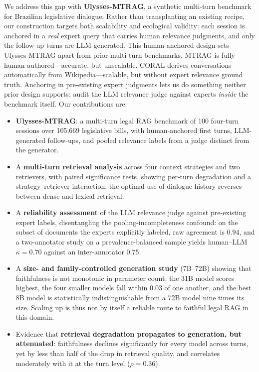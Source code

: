\documentclass[conference]{IEEEtran}
\begin{document}
We address this gap with \textbf{Ulysses-MTRAG}, a synthetic multi-turn benchmark
for Brazilian legislative dialogue. Rather than transplanting an existing recipe,
our construction targets both scalability and ecological validity: each session is
anchored in a \emph{real} expert query that carries human relevance judgments, and
only the follow-up turns are LLM-generated. This human-anchored design sets
Ulysses-MTRAG apart from prior multi-turn benchmarks. MTRAG \cite{Katsis2025MTRAG}
is fully human-authored---accurate, but unscalable. CORAL \cite{Cheng2025CORAL}
derives conversations automatically from Wikipedia---scalable, but without expert
relevance ground truth. Anchoring in pre-existing expert judgments lets us do
something neither prior design supports: audit the LLM relevance judge against
experts \emph{inside} the benchmark itself. Our contributions are:
\begin{itemize}
  \item \textbf{Ulysses-MTRAG}: a multi-turn legal RAG benchmark of 100 four-turn
  sessions over 105{,}669 legislative bills, with human-anchored first turns,
  LLM-generated follow-ups, and pooled relevance labels from a judge distinct from
  the generator.
  \item A \textbf{multi-turn retrieval analysis} across four context strategies and
  two retrievers, with paired significance tests, showing per-turn degradation and a
  strategy--retriever interaction: the optimal use of dialogue history reverses
  between dense and lexical retrieval.
  \item A \textbf{reliability assessment} of the LLM relevance judge against
  pre-existing expert labels, disentangling the pooling-incompleteness confound:
  on the subset of documents the experts explicitly labeled, raw agreement is
  $0.94$, and a two-annotator study on a prevalence-balanced sample yields
  human--LLM $\kappa{=}0.70$ against an inter-annotator $0.75$.
  \item A \textbf{size- and family-controlled generation study} (7B--72B) showing
  that faithfulness is not monotonic in parameter count: the 31B model scores
  highest, the four smaller models fall within 0.03 of one another, and the best
  8B model is statistically indistinguishable from a 72B model nine times its
  size. Scaling up is thus not by itself a reliable route to faithful legal RAG in
  this domain.
  \item Evidence that \textbf{retrieval degradation propagates to generation, but
  attenuated}: faithfulness declines significantly for every model across turns,
  yet by less than half of the drop in retrieval quality, and correlates
  moderately with it at the turn level ($\rho{=}0.36$).
\end{itemize}
\end{document}
